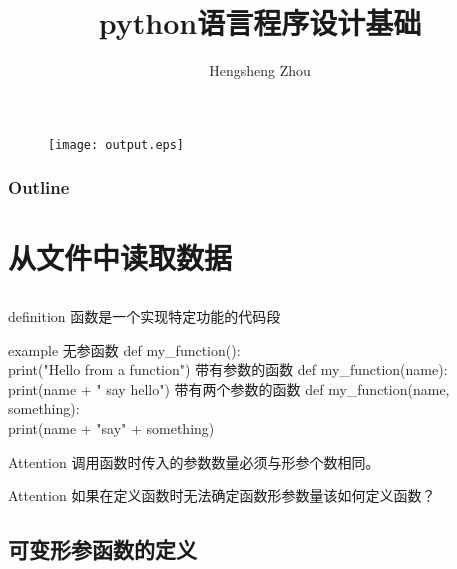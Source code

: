 \documentclass{beamer}
\title{python语言程序设计基础}
\author{Hengsheng Zhou}
\institute{电信与智能制造学院}
\begin{document}
\begin{frame}[t]
	\titlepage
	\begin{figure}
		\begin{center}
			\texttt{[image: output.eps]}
		\end{center}
	\end{figure}


\end{frame}
\begin{frame}
	\frametitle{Outline}
	\tableofcontents
\end{frame}

\section{从文件中读取数据}

\subsection{}

\begin{frame}[t]
	\begin{block}{definition}
		函数是一个实现特定功能的代码段

	\end{block}
	\pause
	\begin{block}{example}
		无参函数
		def my\_function():\\
		print("Hello from a function")
		带有参数的函数
		def my\_function(name):\\
		print(name + " say hello")
		带有两个参数的函数
		def my\_function(name, something):\\
		print(name + "say" + something)

	\end{block}
	\pause

	\begin{alertblock}{Attention}
		调用函数时传入的参数数量必须与形参个数相同。
	\end{alertblock}
	\pause
	\begin{alertblock}{Attention}
		如果在定义函数时无法确定函数形参数量该如何定义函数？
	\end{alertblock}



\end{frame}
\subsection{可变形参函数的定义}
\end{document}
